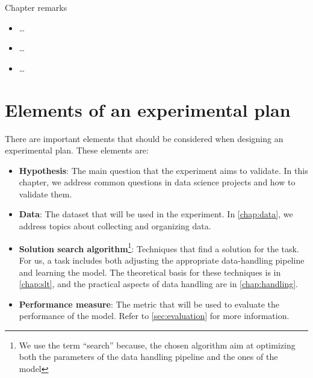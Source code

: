 \begin{mainbox}{Chapter remarks}


  \startcontents[chapters]
  \vspace{1em}


  \begin{itemize}
    \item \dots
  \end{itemize}


  \begin{itemize}
    \item \dots
  \end{itemize}


  \begin{itemize}
    \item \dots
  \end{itemize}
\end{mainbox}

{}
\clearpage



\section{Elements of an experimental plan}

There are important elements that should be considered when designing an experimental
plan.  These elements are:
\begin{itemize}
  \item \textbf{Hypothesis}: The main question that the experiment aims to validate.
    In this chapter, we address common questions in data science projects and how to
    validate them.
  \item \textbf{Data}: The dataset that will be used in the experiment.  In
    \cref{chap:data}, we address topics about collecting and organizing data.
  \item \textbf{Solution search algorithm}\footnote{We use the term ``search'' because,
    the chosen algorithm aim at optimizing both the parameters of the data handling
    pipeline and the ones of the model}: Techniques that find a solution for the task.
    For us, a task includes both adjusting the appropriate data-handling
    pipeline and learning the model.  The theoretical basis for these techniques is in
    \cref{chap:slt}, and the practical aspects of data handling are in \cref{chap:handling}.
  \item \textbf{Performance measure}: The metric that will be used to evaluate the
    performance of the model.  Refer to \cref{sec:evaluation} for more information.
\end{itemize}


